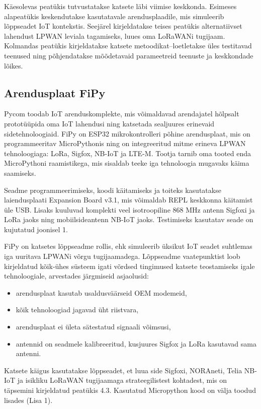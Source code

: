 \documentclass[12pt]{article}
\begin{document}
Käesolevas peatükis tutvustatakse katsete läbi viimise keskkonda.
Esimeses alapeatükis keskendutakse kasutatavale arendusplaadile, mis simuleerib lõppseadet IoT kontekstis.
Seejärel kirjeldatakse teises peatükis alternatiivset lahendust LPWAN leviala tagamiseks, luues oma LoRaWANi tugijaam.
Kolmandas peatükis kirjeldatakse katsete metoodikat--loetletakse üles testitavad teenused ning põhjendatakse mõõdetavaid parameetreid teenuste ja keskkondade lõikes.

\subsection{Arendusplaat FiPy}

Pycom toodab IoT arenduskomplekte, mis võimaldavad arendajatel hõlpsalt prototüüpida oma IoT lahendusi ning katsetada sealjuures erinevaid sidetehnoloogiaid.
FiPy on ESP32 mikrokontrolleri põhine arendusplaat, mis on programmeeritav MicroPythonis ning on integreeritud mitme erineva LPWAN tehnoloogiaga: LoRa, Sigfox, NB-IoT ja LTE-M.
Tootja tarnib oma tooted enda MicroPythoni raamistikega, mis sisaldab teeke iga tehnoloogia mugavaks käima saamiseks.

Seadme programmeerimiseks, koodi käitamiseks ja toiteks kasutatakse laiendusplaati Expansion Board v3.1, mis võimaldab REPL keskkonna käitamist üle USB.
Lisaks kuuluvad komplekti veel isotroopiline 868 MHz antenn Sigfoxi ja LoRa jaoks ning mobiilsideantenn NB-IoT jaoks.
Testimiseks kasutatav seade on kujutatud joonisel 1.

FiPy on katsetes lõppseadme rollis, ehk simuleerib üksikut IoT seadet suhtlemas iga uuritava LPWANi võrgu tugijaamadega.
Lõppseadme vaatepunktist loob kirjeldatud kõik-ühes süsteem igati võrdsed tingimused katsete teostamiseks igale tehnoloogiale, arvestades järgmiseid asjaolusid:
\begin{itemize}
    \item arendusplaat kasutab usaldusväärseid OEM modemeid,
    \item kõik tehnoloogiad jagavad üht riistvara,
    \item arendusplaat ei ületa sätestatud signaali võimsusi,
    \item antennid on seadmele kalibreeritud, kusjuures Sigfox ja LoRa kasutavad sama antenni.
\end{itemize}
Katsete käigus kasutatakse lõppseadet, et luua side Sigfoxi, NORAneti, Telia NB-IoT ja isikliku LoRaWAN tugijaamaga strateegilistest kohtadest, mis on täpsemini kirjeldatud peatükis 4.3.
Kasutatud Micropython kood on välja toodud lisades (Lisa 1).
\end{document}
